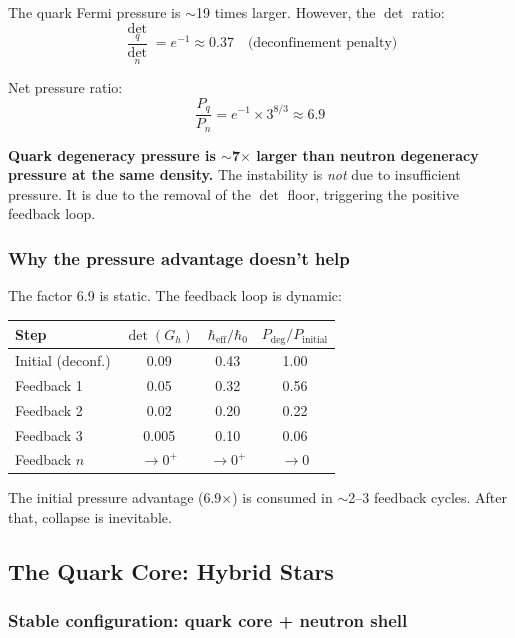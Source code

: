 \documentclass[12pt]{article}
\theoremstyle{remark}
\theoremstyle{definition}
\begin{document}
The quark Fermi pressure is $\sim$19 times larger. However, the $\det$ ratio:
\begin{equation}
\frac{\det_q}{\det_n} = e^{-1} \approx 0.37 \quad \text{(deconfinement penalty)}
\end{equation}

Net pressure ratio:
\begin{equation}
\frac{P_q}{P_n} = e^{-1} \times 3^{8/3} \approx 6.9
\end{equation}

\textbf{Quark degeneracy pressure is $\sim$7$\times$ larger than neutron degeneracy pressure at the same density.} The instability is \emph{not} due to insufficient pressure. It is due to the removal of the $\det$ floor, triggering the positive feedback loop.

\subsubsection{Why the pressure advantage doesn't help}

The factor 6.9 is static. The feedback loop is dynamic:

\begin{center}
\begin{tabular}{lccc}
\hline
Step & $\det(G_h)$ & $\hbar_\text{eff}/\hbar_0$ & $P_\text{deg}/P_\text{initial}$ \\
\hline
Initial (deconf.) & 0.09 & 0.43 & 1.00 \\
Feedback 1 & 0.05 & 0.32 & 0.56 \\
Feedback 2 & 0.02 & 0.20 & 0.22 \\
Feedback 3 & 0.005 & 0.10 & 0.06 \\
Feedback $n$ & $\to 0^+$ & $\to 0^+$ & $\to 0$ \\
\hline
\end{tabular}
\end{center}

The initial pressure advantage (6.9$\times$) is consumed in $\sim$2--3 feedback cycles. After that, collapse is inevitable.

\subsection{The Quark Core: Hybrid Stars}

\subsubsection{Stable configuration: quark core + neutron shell}
\end{document}

